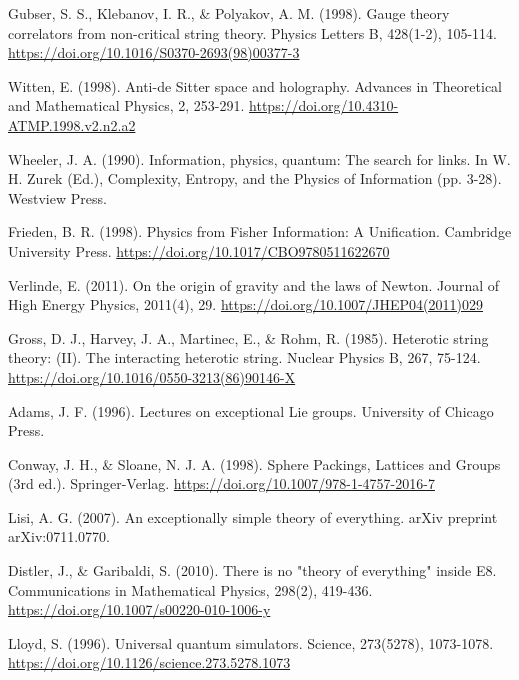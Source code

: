 \documentclass[11pt,english,twoside]{article}
\begin{document}
\begin{thebibliography}{99}
 Gubser, S. S., Klebanov, I. R., \& Polyakov, A. M. (1998). Gauge theory correlators from non-critical string theory. Physics Letters B, 428(1-2), 105-114. \href{https://doi.org/10.1016/S0370-2693(98)00377-3}{https://doi.org/10.1016/S0370-2693(98)00377-3}

 Witten, E. (1998). Anti-de Sitter space and holography. Advances in Theoretical and Mathematical Physics, 2, 253-291. \href{https://doi.org/10.4310-ATMP.1998.v2.n2.a2}{https://doi.org/10.4310-ATMP.1998.v2.n2.a2}

 Wheeler, J. A. (1990). Information, physics, quantum: The search for links. In W. H. Zurek (Ed.), Complexity, Entropy, and the Physics of Information (pp. 3-28). Westview Press.

 Frieden, B. R. (1998). Physics from Fisher Information: A Unification. Cambridge University Press. \href{https://doi.org/10.1017/CBO9780511622670}{https://doi.org/10.1017/CBO9780511622670}

 Verlinde, E. (2011). On the origin of gravity and the laws of Newton. Journal of High Energy Physics, 2011(4), 29. \href{https://doi.org/10.1007/JHEP04(2011)029}{https://doi.org/10.1007/JHEP04(2011)029}

 Gross, D. J., Harvey, J. A., Martinec, E., \& Rohm, R. (1985). Heterotic string theory: (II). The interacting heterotic string. Nuclear Physics B, 267, 75-124. \href{https://doi.org/10.1016/0550-3213(86)90146-X}{https://doi.org/10.1016/0550-3213(86)90146-X}

 Adams, J. F. (1996). Lectures on exceptional Lie groups. University of Chicago Press.

 Conway, J. H., \& Sloane, N. J. A. (1998). Sphere Packings, Lattices and Groups (3rd ed.). Springer-Verlag. \href{https://doi.org/10.1007/978-1-4757-2016-7}{https://doi.org/10.1007/978-1-4757-2016-7}

 Lisi, A. G. (2007). An exceptionally simple theory of everything. arXiv preprint arXiv:0711.0770.

 Distler, J., \& Garibaldi, S. (2010). There is no "theory of everything" inside E8. Communications in Mathematical Physics, 298(2), 419-436. \href{https://doi.org/10.1007/s00220-010-1006-y}{https://doi.org/10.1007/s00220-010-1006-y}

 Lloyd, S. (1996). Universal quantum simulators. Science, 273(5278), 1073-1078. \href{https://doi.org/10.1126/science.273.5278.1073}{https://doi.org/10.1126/science.273.5278.1073}


\end{thebibliography}
\end{document}
